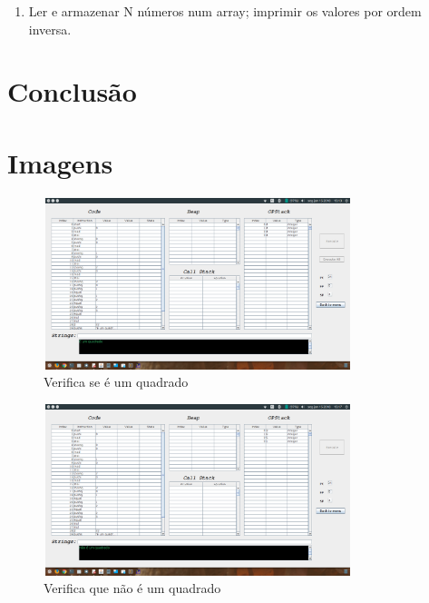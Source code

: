 \documentclass{report}
\begin{document}
\begin{enumerate}
	\begin{code}
		
	\end{code}

	\indent
	
	
	\item Ler e armazenar N números num array; imprimir os valores por ordem inversa.
	
	\begin{code}
		
	\end{code}

	\indent
	
	
\end{enumerate}
  





\chapter{Conclusão} \label{concl}
 

\appendix
\chapter{Imagens}

\begin{figure}[h]
	\centering
	\includegraphics[width=9cm,height= 5cm]{exemplo1-1.png}
	\caption{Verifica se é um quadrado}
	\label{Exemplo 1.1}
\end{figure}

\begin{figure}[h]
	\centering
	\includegraphics[width=9cm,height= 5cm]{exemplo1-2.png}
	\caption{Verifica que não é um quadrado}
	\label{Exemplo 1.2}
\end{figure}
\end{document}
